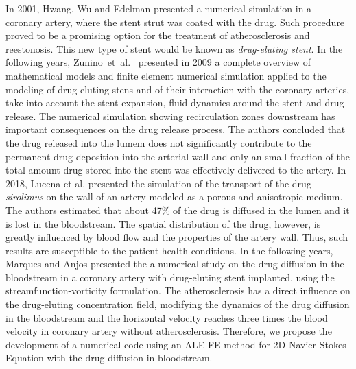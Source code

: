 \documentclass[10pt,fleqn,a4paper,twoside]{article}
\begin{document}
\smallskip
In 2001,
Hwang, Wu and Edelman \cite{hwang2001} presented
a numerical simulation in a coronary artery, 
where the stent strut 
was coated with the drug.
Such procedure proved to be a promising option
for the treatment of atherosclerosis and reestonosis.
This new type of stent
would be known as \textit{drug-eluting stent}.
In the following years,
\mbox{Zunino et al. \cite{zunino2009}} presented 
in 2009 a complete overview
of mathematical models and finite element numerical simulation
applied to the  modeling of drug eluting stens and
of their interaction with
the coronary arteries, take into account the stent expansion,
fluid dynamics around the stent and drug release. The numerical
simulation showing recirculation zones downstream
has important consequences on the drug release process.
The authors concluded that the drug released into the lumem
does not significantly contribute to the permanent drug
deposition into the arterial wall and only an small fraction of
the total amount drug stored into the stent was effectively
delivered to the artery.
In 2018, Lucena et al. \cite{lucena2018} presented
the simulation of the transport of the drug \textit{sirolimus}
 on the wall of an artery modeled as a porous and anisotropic medium.
 The authors estimated that
 about 47\% of the drug is diffused in the lumen and it is lost in
 the bloodstream. The spatial distribution of the drug, however,
 is greatly influenced by blood flow and the properties of
the artery wall. Thus, such results are susceptible to the
 patient health conditions.
In the following years,
Marques and Anjos \cite{marques2021} presented the
a numerical study on the drug diffusion in the bloodstream
in a coronary artery with drug-eluting stent implanted,
using the streamfunction-vorticity formulation.
The atherosclerosis has a direct influence
on the drug-eluting concentration field, 
modifying the dynamics of the drug diffusion in
the bloodstream and the horizontal velocity reaches
three times the blood velocity in coronary artery 
without atherosclerosis.
Therefore, we propose the development of a numerical code 
using an ALE-FE method for 2D Navier-Stokes Equation
with the drug diffusion in bloodstream.
\end{document}
